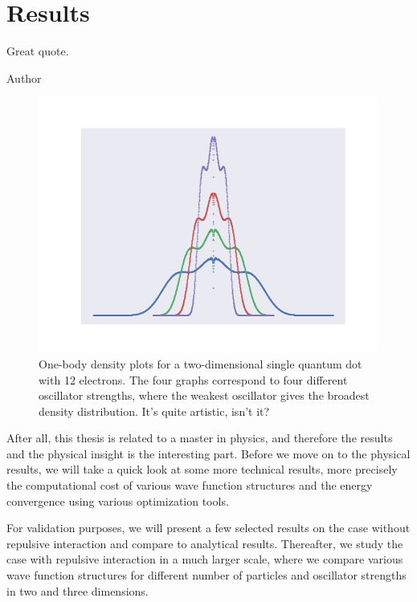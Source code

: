 \chapter{Results} \label{sec:results}
\epigraph{Great quote.}{Author}
\begin{figure}[H]
	\centering
	\includegraphics[scale=0.7]{Images/art.png}
	\caption{One-body density plots for a two-dimensional single quantum dot with 12 electrons. The four graphs correspond to four different oscillator strengths, where the weakest oscillator gives the broadest density distribution. It's quite artistic, isn't it?}
\end{figure}
After all, this thesis is related to a master in physics, and therefore the results and the physical insight is the interesting part. Before we move on to the physical results, we will take a quick look at some more technical results, more precisely the computational cost of various wave function structures and the energy convergence using various optimization tools. 

For validation purposes, we will present a few selected results on the case without repulsive interaction and compare to analytical results. Thereafter, we study the case with repulsive interaction in a much larger scale, where we compare various wave function structures for different number of particles and oscillator strengths in two and three dimensions.

\newpage
